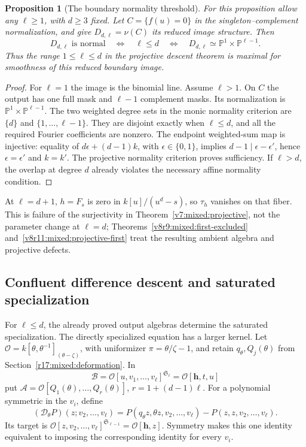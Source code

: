 \documentclass[10pt,fleqn]{article}
\numberwithin{equation}{section}
\newtheorem{proposition}[theorem]{Proposition}
\newcommand{\PP}{\mathbb P}
\begin{document}
\begin{proposition}[The boundary normality threshold]
\label{v8:mixed:boundary-threshold}
For this proposition allow any $\ell\ge1$, with $d\ge3$ fixed.
Let $C=\{f(u)=0\}$ in the singleton--complement normalization,
and give $D_{d,\ell}=\nu(C)$ its reduced image structure.  Then
\[
 D_{d,\ell}\text{ is normal}
 \quad\Longleftrightarrow\quad \ell\le d
 \quad\Longleftrightarrow\quad
 D_{d,\ell}\simeq\PP^1\times\PP^{\ell-1}.
\]
Thus the range $1\le\ell\le d$ in the projective descent theorem
is maximal for smoothness of this reduced boundary image.
\end{proposition}
\begin{proof}
For $\ell=1$ the image is the binomial line.  Assume $\ell>1$.
On $C$ the output has one full mask and $\ell-1$ complement masks.
Its normalization is $\PP^1\times\PP^{\ell-1}$.
The two weighted degree sets in the monic normality criterion
\cite[Theorem~6.1]{LiProfileGeometry} are $\{d\}$ and
$\{1,\ldots,\ell-1\}$.  They are disjoint exactly when $\ell\le d$,
and all the required Fourier coefficients are nonzero.
The endpoint weighted-sum map is injective: equality of
$d\epsilon+(d-1)k$, with $\epsilon\in\{0,1\}$, implies
$d-1\mid\epsilon-\epsilon'$, hence $\epsilon=\epsilon'$ and $k=k'$.
The projective normality criterion \cite[Theorem~6.2]{LiProfileGeometry} proves sufficiency.  If $\ell>d$, the overlap at degree $d$ already violates
the necessary affine normality condition.
\end{proof}

At $\ell=d+1$, $h=F_s$ is zero in $k[u]/(u^d-s)$, so $\tau_h$
vanishes on that fiber.  This is failure of the surjectivity in
Theorem~\ref{v7:mixed:projective}, not the parameter change at $\ell=d$;
Theorems~\ref{v8r9:mixed:first-excluded} and~\ref{v8r11:mixed:projective-first}
treat the resulting ambient algebra and projective defects.


\subsection{Confluent difference descent and saturated specialization}

For $\ell\le d$, the already proved output algebras determine the
saturated specialization.  The directly specialized equation has a larger
kernel.  Let $\mathscr O=k[\theta,\theta^{-1}]_{(\theta-\zeta)}$, with uniformizer
$\pi=\theta/\zeta-1$, and retain $q_\theta,Q_j(\theta)$ from
Section~\ref{r17:mixed:deformation}.  In
\[
 \mathscr B=\mathscr O[u,v_1,\ldots,v_\ell]^{\mathfrak S_\ell}
             =\mathscr O[\mathbf h,t,u]
\]
put $\mathscr A=\mathscr O[Q_1(\theta),\ldots,Q_r(\theta)]$,
$r=1+(d-1)\ell$.  For a polynomial symmetric in the $v_i$, define
\[
 (\mathscr D_\theta P)(z;v_2,\ldots,v_\ell)
 =P(q_\theta z,\theta z,v_2,\ldots,v_\ell)
     -P(z,z,v_2,\ldots,v_\ell).
\]
Its target is $\mathscr O[z,v_2,\ldots,v_\ell]^{\mathfrak S_{\ell-1}}
=\mathscr O[\mathbf h,z]$.  Symmetry makes this one identity equivalent
to imposing the corresponding identity for every $v_i$.
\end{document}
